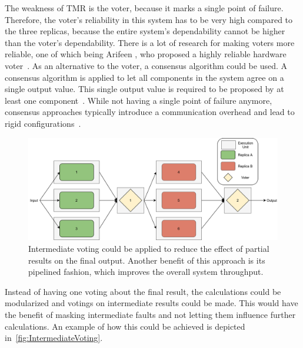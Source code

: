 The weakness of \gls*{TMR} is the voter, because it marks a single point of failure.
Therefore, the voter's reliability in this system has to be very high compared to the three replicas, because the entire system's dependability cannot be higher than the voter's dependability.
There is a lot of research for making voters more reliable, one of which being Arifeen \etal, who proposed a highly reliable hardware voter~\cite{ArifeenFaultTolerantTMR}.
As an alternative to the voter, a consensus algorithm could be used.
A consensus algorithm is applied to let all components in the system agree on a single output value.
This single output value is required to be proposed by at least one component~\cite{lamport2001paxos}.
While not having a single point of failure anymore, consensus approaches typically introduce a communication overhead and lead to rigid configurations~\cite{GamerIncreasingMOON}.

\begin{figure}[!hb]
	\centering
	\includegraphics[width=0.75\linewidth]{images/IntermediateVoting}
	\caption{Intermediate voting could be applied to reduce the effect of partial results on the final output. Another benefit of this approach is its pipelined fashion, which improves the overall system throughput.}
	\label{fig:IntermediateVoting}
\end{figure}

Instead of having one voting about the final result, the calculations could be modularized and votings on intermediate results could be made.
This would have the benefit of masking intermediate faults and not letting them influence further calculations.
An example of how this could be achieved is depicted in~\autoref{fig:IntermediateVoting}.


